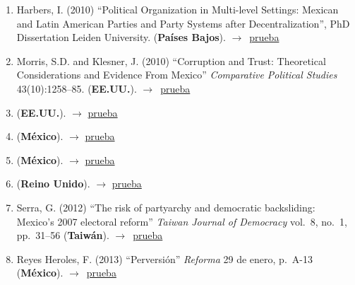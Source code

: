 \documentclass[12 pt, letter]{article}
\newenvironment{CitasMiTrabajo}{
    \begin{footnotesize}
    \begin{enumerate}[label={\footnotesize\emph{cita~\arabic*}},ref=\arabic*] %
        \setlength{\itemsep}{.1\itemsep}
        \setlength{\parskip}{.1\parskip}
    }{\end{enumerate}\end{footnotesize}}
\begin{document}
\begin{CitasMiTrabajo}
        \item Harbers, I. (2010)
            ``Political Organization	in Multi-level Settings: Mexican and Latin American Parties and Party Systems after Decentralization'', PhD Dissertation Leiden University. (\textbf{Pa\'ises Bajos}). $\rightarrow$~\href{http://ericmagar.com/cv/cites/estevezEtalElecStud/harbers.excerpt.pdf}{prueba}

        \item Morris, S.D. and Klesner, J. (2010)
            ``Corruption and Trust: Theoretical Considerations and Evidence From Mexico''
            \emph{Comparative Political Studies} 43(10):1258--85. (\textbf{EE.UU.}). $\rightarrow$~\href{http://ericmagar.com/cv/cites/estevezEtalElecStud/morris.klesnerCorruptionTrustMx2010cps.pdf}{prueba}

        \item {} (\textbf{EE.UU.}).  $\rightarrow$ \href{http://ericmagar.com/cv/cites/estevezEtalElecStud/fowler2010phd.pdf}{prueba}

        \item {} (\textbf{M\'exico}).  $\rightarrow$ \href{http://ericmagar.com/cv/cites/estevezEtalElecStud/diazSandoval2011phd.pdf}{prueba}

        \item {} (\textbf{M\'exico}).  $\rightarrow$ \href{http://ericmagar.com/cv/cites/estevezEtalElecStud/barrientos2011.pdf}{prueba}

        \item {} (\textbf{Reino Unido}).  $\rightarrow$ \href{http://ericmagar.com/cv/cites/estevezEtalElecStud/birch2011.pdf}{prueba}

        \item Serra, G. (2012)
            ``The risk of partyarchy and democratic backsliding: Mexico's 2007 electoral reform''
            \emph{Taiwan Journal of Democracy}
            vol.\ 8, no.\ 1, pp.\ 31--56 (\textbf{Taiw\'an}). $\rightarrow$~\href{http://ericmagar.com/cv/cites/estevezEtalElecStud/serraElecRefMexico2012tjd.pdf}{prueba}

        \item Reyes Heroles, F. (2013)
            ``Perversi\'on''
            \emph{Reforma}
            29 de enero, p.\ A-13 (\textbf{M\'exico}). $\rightarrow$~\href{http://ericmagar.com/cv/cites/estevezEtalElecStud/reyesHeroles2013.pdf}{prueba}


\end{CitasMiTrabajo}
\end{document}
